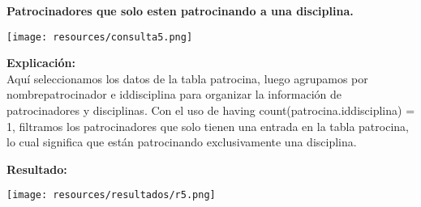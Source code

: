 \textbf{Patrocinadores que solo esten patrocinando a una disciplina.}\vspace{.3cm}

\begin{center}
	\texttt{[image: resources/consulta5.png]}
\end{center} 

\textbf{Explicación:} \\
Aquí seleccionamos los datos de la tabla patrocina, luego agrupamos por nombrepatrocinador e iddisciplina para organizar la información de patrocinadores y disciplinas. Con el uso de having count(patrocina.iddisciplina) = 1, filtramos los patrocinadores que solo tienen una entrada en la tabla patrocina, lo cual significa que están patrocinando exclusivamente una disciplina.\vspace{.3cm}

\textbf{Resultado:}
\begin{center}
	\texttt{[image: resources/resultados/r5.png]}
\end{center} 